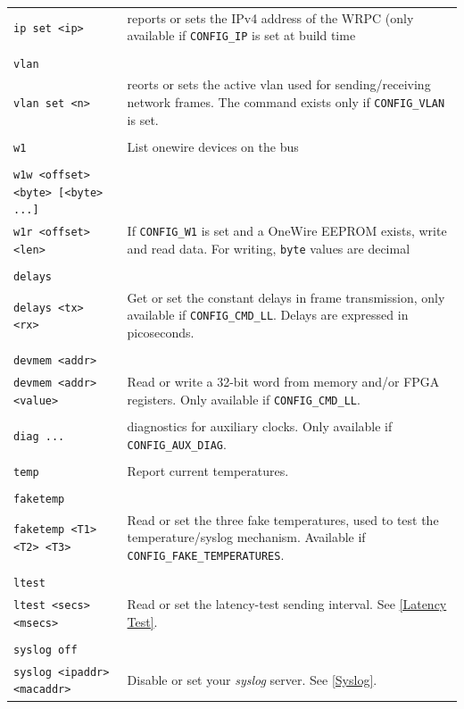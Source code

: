 \documentclass[a4paper, 12pt]{article}
\newcommand{\code}[1]{\texttt{#1}}
\begin{document}
\begin{longtable}{  p{7.5cm}  p{7cm} }
  \code{ip set <ip>} & reports or sets the IPv4 address of the WRPC (only available if \texttt{CONFIG\_IP} is set at build time\\
 & \\
  \code{vlan} & \\

  \code{vlan set <n>} & reorts or sets the active vlan used for sending/receiving network frames. The command exists only if \texttt{CONFIG\_VLAN} is set.\\
 & \\
  \code{w1} & List onewire devices on the bus\\
 & \\
  \code{w1w <offset> <byte> [<byte> ...]}& \\

  \code{w1r <offset> <len>} & If \texttt{CONFIG\_W1} is set and a OneWire EEPROM exists, write and read data. For writing, \texttt{byte} values are decimal\\
 & \\
  \code{delays}&\\

  \code{delays <tx> <rx>} & Get or set the constant delays in frame transmission, only available if \texttt{CONFIG\_CMD\_LL}. Delays are expressed in picoseconds.\\
 & \\
  \code{devmem <addr>} & \\

  \code{devmem <addr> <value>} & Read or write a 32-bit word from memory and/or FPGA registers. Only available if \texttt{CONFIG\_CMD\_LL}.\\
 & \\
  \code{diag ...} & diagnostics for auxiliary clocks. Only available if \texttt{CONFIG\_AUX\_DIAG}.\\
 & \\
  \code{temp} & Report current temperatures.\\
 & \\
  \code{faketemp} & \\

  \code{faketemp <T1> <T2> <T3>}  & Read or set the three fake temperatures, used to test the temperature/syslog mechanism. Available if \texttt{CONFIG\_FAKE\_TEMPERATURES}.\\
 & \\
  \code{ltest} & \\

  \code{ltest <secs> <msecs>} & Read or set the latency-test sending interval. See \ref{Latency Test}.\\
 & \\
  \code{syslog off} & \\

  \code{syslog <ipaddr> <macaddr>} & Disable or set your \textit{syslog} server. See \ref{Syslog}.\\

\end{longtable}
\end{document}
